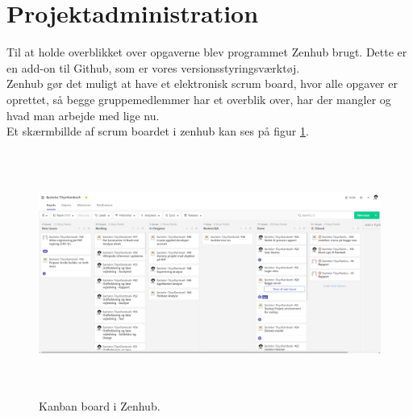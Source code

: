 \section{Projektadministration}
Til at holde overblikket over opgaverne blev programmet Zenhub brugt. Dette er en add-on til Github, som er vores versionsstyringsværktøj. \\
Zenhub gør det muligt at have et elektronisk scrum board, hvor alle opgaver er oprettet, så begge gruppemedlemmer har et overblik over, har der mangler og hvad man arbejde med lige nu. \\
Et skærmbillde af scrum boardet i zenhub kan ses på figur \ref{fig:ZenhubScrum}.

\begin{figure} [H]
	\begin{center}
		\includegraphics[height=8cm, width=15cm]{Projektadministration/Zenhub}
	\end{center}
	\caption{Kanban board i Zenhub.}
	\label{fig:ZenhubScrum}
\end{figure} 
